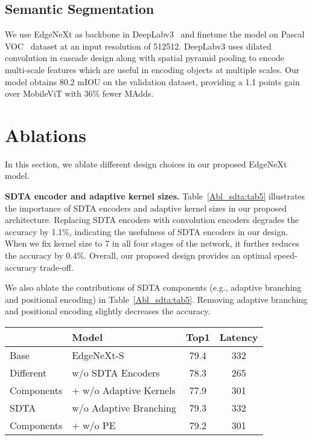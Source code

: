 \documentclass[runningheads]{llncs}
\begin{document}
\subsection{Semantic Segmentation}
We use EdgeNeXt as backbone in DeepLabv3~\cite{chen2017rethinking} and finetune the model on Pascal VOC~\cite{voc} dataset at an input resolution of 512512. DeepLabv3 uses dilated convolution in cascade design along with spatial pyramid pooling to encode multi-scale features which are useful in encoding objects at multiple scales. Our model obtains 80.2 mIOU on the validation dataset, providing a 1.1 points gain over MobileViT with 36\% fewer MAdds.


\section{Ablations}
In this section, we ablate different design choices in our proposed EdgeNeXt model.

\noindent\textbf{SDTA encoder and adaptive kernel sizes.}
Table~\ref{Abl_sdta:tab5} illustrates the importance of SDTA encoders and adaptive kernel sizes in our proposed architecture. Replacing SDTA encoders with convolution encoders degrades the accuracy by 1.1\%, indicating the usefulness of SDTA encoders in our design. When we fix kernel size to 7 in all four stages of the network, it further reduces the accuracy by 0.4\%. Overall, our proposed design provides an optimal speed-accuracy trade-off.

We also ablate the contributions of SDTA components (e.g., adaptive branching and positional encoding) in Table~\ref{Abl_sdta:tab5}. Removing adaptive branching and positional encoding slightly decreases the accuracy.

\begin{SCtable}[\sidecaptionrelwidth][h!]
\begin{tabular}{l|l|c|c}
\toprule
\rowcolor{Gray}  &  Model & Top1 & Latency  \\
\midrule
\rowcolor{orange!6} Base & EdgeNeXt-S & 79.4 & 332  \\
\midrule
Different & w/o SDTA Encoders & 78.3 & 265   \\
Components & + w/o Adaptive Kernels & 77.9 & 301  \\
\midrule
SDTA & w/o Adaptive Branching  & 79.3 & 332  \\
Components & + w/o PE & 79.2 & 301  \\
\bottomrule 
\end{tabular}
\caption{Ablation on different components of EdgeNeXt and SDTA encoder. The results show the benefits of SDTA encoders and adaptive kernels in our design. Further, adaptive branching and positional encoding (PE) are also required in SDTA module.}
\label{Abl_sdta:tab5}
\end{SCtable}
\end{document}
